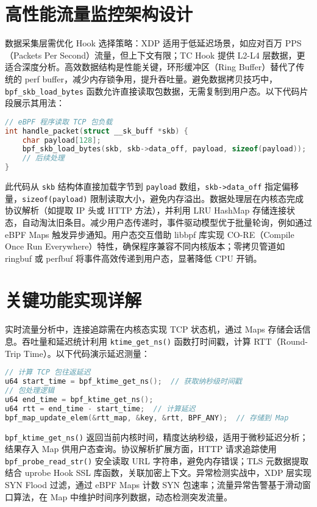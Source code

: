 \chapter{高性能流量监控架构设计}
数据采集层需优化 Hook 选择策略：XDP 适用于低延迟场景，如应对百万 PPS（Packets Per Second）流量，但上下文有限；TC Hook 提供 L2-L4 层数据，更适合深度分析。高效数据结构是性能关键，环形缓冲区（Ring Buffer）替代了传统的 perf buffer，减少内存锁争用，提升吞吐量。避免数据拷贝技巧中，\texttt{bpf\_{}skb\_{}load\_{}bytes} 函数允许直接读取包数据，无需复制到用户态。以下代码片段展示其用法：\par
\begin{lstlisting}[language=c]
// eBPF 程序读取 TCP 包负载
int handle_packet(struct __sk_buff *skb) {
    char payload[128];
    bpf_skb_load_bytes(skb, skb->data_off, payload, sizeof(payload));
    // 后续处理
}
\end{lstlisting}
此代码从 \texttt{skb} 结构体直接加载字节到 \texttt{payload} 数组，\texttt{skb->data\_{}off} 指定偏移量，\texttt{sizeof(payload)} 限制读取大小，避免内存溢出。数据处理层在内核态完成协议解析（如提取 IP 头或 HTTP 方法），并利用 LRU HashMap 存储连接状态，自动淘汰旧条目。减少用户态传递时，事件驱动模型优于批量轮询，例如通过 eBPF Maps 触发异步通知。用户态交互借助 libbpf 库实现 CO-RE（Compile Once Run Everywhere）特性，确保程序兼容不同内核版本；零拷贝管道如 ringbuf 或 perfbuf 将事件高效传递到用户态，显著降低 CPU 开销。\par
\chapter{关键功能实现详解}
实时流量分析中，连接追踪需在内核态实现 TCP 状态机，通过 Maps 存储会话信息。吞吐量和延迟统计利用 \texttt{ktime\_{}get\_{}ns()} 函数打时间戳，计算 RTT（Round-Trip Time）。以下代码演示延迟测量：\par
\begin{lstlisting}[language=c]
// 计算 TCP 包往返延迟
u64 start_time = bpf_ktime_get_ns();  // 获取纳秒级时间戳
// 包处理逻辑
u64 end_time = bpf_ktime_get_ns();
u64 rtt = end_time - start_time;  // 计算延迟
bpf_map_update_elem(&rtt_map, &key, &rtt, BPF_ANY);  // 存储到 Map
\end{lstlisting}
\texttt{bpf\_{}ktime\_{}get\_{}ns()} 返回当前内核时间，精度达纳秒级，适用于微秒延迟分析；结果存入 Map 供用户态查询。协议解析扩展方面，HTTP 请求追踪使用 \texttt{bpf\_{}probe\_{}read\_{}str()} 安全读取 URL 字符串，避免内存错误；TLS 元数据提取结合 uprobe Hook SSL 库函数，关联加密上下文。异常检测实战中，XDP 层实现 SYN Flood 过滤，通过 eBPF Maps 计数 SYN 包速率；流量异常告警基于滑动窗口算法，在 Map 中维护时间序列数据，动态检测突发流量。\par
